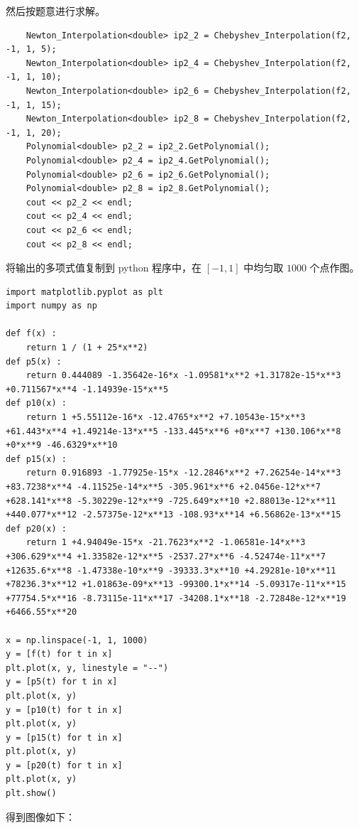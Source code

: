 \documentclass{ctexart}
\begin{document}
然后按题意进行求解。
\begin{verbatim}
    Newton_Interpolation<double> ip2_2 = Chebyshev_Interpolation(f2, -1, 1, 5);
    Newton_Interpolation<double> ip2_4 = Chebyshev_Interpolation(f2, -1, 1, 10);
    Newton_Interpolation<double> ip2_6 = Chebyshev_Interpolation(f2, -1, 1, 15);
    Newton_Interpolation<double> ip2_8 = Chebyshev_Interpolation(f2, -1, 1, 20);
    Polynomial<double> p2_2 = ip2_2.GetPolynomial();
    Polynomial<double> p2_4 = ip2_4.GetPolynomial();
    Polynomial<double> p2_6 = ip2_6.GetPolynomial();
    Polynomial<double> p2_8 = ip2_8.GetPolynomial();
    cout << p2_2 << endl;
    cout << p2_4 << endl;
    cout << p2_6 << endl;
    cout << p2_8 << endl;
\end{verbatim}

将输出的多项式值复制到 python 程序中，在 $[-1,1]$ 中均匀取 $1000$ 个点作图。

\begin{verbatim}
import matplotlib.pyplot as plt
import numpy as np

def f(x) :
    return 1 / (1 + 25*x**2)
def p5(x) :
    return 0.444089 -1.35642e-16*x -1.09581*x**2 +1.31782e-15*x**3 +0.711567*x**4 -1.14939e-15*x**5
def p10(x) :
    return 1 +5.55112e-16*x -12.4765*x**2 +7.10543e-15*x**3 +61.443*x**4 +1.49214e-13*x**5 -133.445*x**6 +0*x**7 +130.106*x**8 +0*x**9 -46.6329*x**10
def p15(x) :
    return 0.916893 -1.77925e-15*x -12.2846*x**2 +7.26254e-14*x**3 +83.7238*x**4 -4.11525e-14*x**5 -305.961*x**6 +2.0456e-12*x**7 +628.141*x**8 -5.30229e-12*x**9 -725.649*x**10 +2.88013e-12*x**11 +440.077*x**12 -2.57375e-12*x**13 -108.93*x**14 +6.56862e-13*x**15
def p20(x) :
    return 1 +4.94049e-15*x -21.7623*x**2 -1.06581e-14*x**3 +306.629*x**4 +1.33582e-12*x**5 -2537.27*x**6 -4.52474e-11*x**7 +12635.6*x**8 -1.47338e-10*x**9 -39333.3*x**10 +4.29281e-10*x**11 +78236.3*x**12 +1.01863e-09*x**13 -99300.1*x**14 -5.09317e-11*x**15 +77754.5*x**16 -8.73115e-11*x**17 -34208.1*x**18 -2.72848e-12*x**19 +6466.55*x**20

x = np.linspace(-1, 1, 1000)
y = [f(t) for t in x]
plt.plot(x, y, linestyle = "--")
y = [p5(t) for t in x]
plt.plot(x, y)
y = [p10(t) for t in x]
plt.plot(x, y)
y = [p15(t) for t in x]
plt.plot(x, y)
y = [p20(t) for t in x]
plt.plot(x, y)
plt.show()
\end{verbatim}

得到图像如下：
\end{document}
